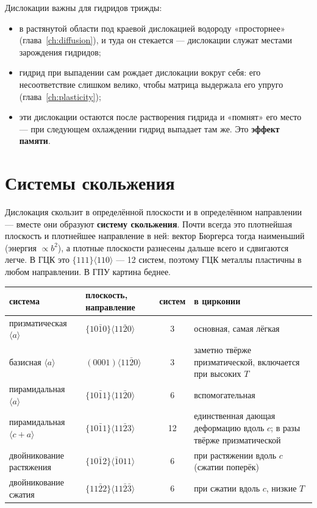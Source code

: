 \begin{zrbox}
Дислокации важны для гидридов трижды:
\begin{itemize}
\item в растянутой области под краевой дислокацией водороду «просторнее» (глава~\ref{ch:diffusion}), и туда он стекается ---
  дислокации служат местами зарождения гидридов;
\item гидрид при выпадении сам рождает дислокации вокруг себя: его несоответствие слишком велико, чтобы матрица
  выдержала его упруго (глава~\ref{ch:plasticity});
\item эти дислокации остаются после растворения гидрида и «помнят» его место --- при следующем охлаждении гидрид
  выпадает там же. Это \textbf{эффект памяти}.
\end{itemize}
\end{zrbox}

\section{Системы скольжения}

Дислокация скользит в определённой плоскости и в определённом направлении --- вместе они образуют
\textbf{систему скольжения}. Почти всегда это плотнейшая плоскость и плотнейшее направление в ней: вектор Бюргерса
тогда наименьший (энергия $\propto b^2$), а плотные плоскости разнесены дальше всего и сдвигаются легче. В ГЦК
это $\{111\}\langle110\rangle$ --- 12 систем, поэтому ГЦК металлы пластичны в любом направлении. В ГПУ картина беднее.

\begin{center}\small
\begin{tabularx}{\linewidth}{>{\raggedright\arraybackslash}p{3.3cm}>{\raggedright\arraybackslash}p{3.0cm}c>{\raggedright\arraybackslash}X}
\toprule
система & плоскость, направление & систем & в цирконии \\
\midrule
призматическая $\langle a\rangle$ & $\{10\bar10\}\langle11\bar20\rangle$ & 3 & основная, самая лёгкая \\
базисная $\langle a\rangle$ & $(0001)\langle11\bar20\rangle$ & 3 & заметно твёрже призматической, включается при высоких $T$ \\
пирамидальная $\langle a\rangle$ & $\{10\bar11\}\langle11\bar20\rangle$ & 6 & вспомогательная \\
пирамидальная $\langle c+a\rangle$ & $\{10\bar11\}\langle11\bar23\rangle$ & 12 & единственная дающая деформацию вдоль $c$; в разы твёрже призматической \\
двойникование растяжения & $\{10\bar12\}\langle\bar1011\rangle$ & 6 & при растяжении вдоль $c$ (сжатии поперёк) \\
двойникование сжатия & $\{11\bar22\}\langle11\bar2\bar3\rangle$ & 6 & при сжатии вдоль $c$, низкие $T$ \\
\bottomrule
\end{tabularx}
\end{center}

